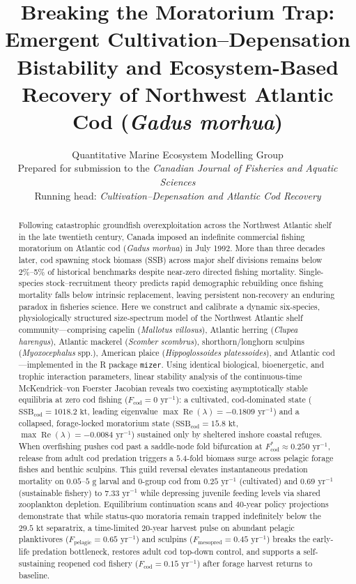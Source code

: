 \documentclass[11pt,letterpaper]{article}
\title{\textbf{Breaking the Moratorium Trap: Emergent Cultivation--Depensation Bistability and Ecosystem-Based Recovery of Northwest Atlantic Cod (\emph{Gadus morhua})}}
\author{
  Quantitative Marine Ecosystem Modelling Group\\[0.3em]
  \small Prepared for submission to the \emph{Canadian Journal of Fisheries and Aquatic Sciences}\\[0.2em]
  \small Running head: \emph{Cultivation--Depensation and Atlantic Cod Recovery}
}
\date{}
\begin{document}
\maketitle

\begin{abstract}
\noindent
Following catastrophic groundfish overexploitation across the Northwest Atlantic shelf in the late twentieth century, Canada imposed an indefinite commercial fishing moratorium on Atlantic cod (\emph{Gadus morhua}) in July 1992. More than three decades later, cod spawning stock biomass (SSB) across major shelf divisions remains below 2\%--5\% of historical benchmarks despite near-zero directed fishing mortality. Single-species stock--recruitment theory predicts rapid demographic rebuilding once fishing mortality falls below intrinsic replacement, leaving persistent non-recovery an enduring paradox in fisheries science. Here we construct and calibrate a dynamic six-species, physiologically structured size-spectrum model of the Northwest Atlantic shelf community---comprising capelin (\emph{Mallotus villosus}), Atlantic herring (\emph{Clupea harengus}), Atlantic mackerel (\emph{Scomber scombrus}), shorthorn/longhorn sculpins (\emph{Myoxocephalus} spp.), American plaice (\emph{Hippoglossoides platessoides}), and Atlantic cod---implemented in the R package \texttt{mizer}. Using identical biological, bioenergetic, and trophic interaction parameters, linear stability analysis of the continuous-time McKendrick--von Foerster Jacobian reveals two coexisting asymptotically stable equilibria at zero cod fishing ($F_{\mathrm{cod}} = 0\text{ yr}^{-1}$): a cultivated, cod-dominated state ($\mathrm{SSB}_{\mathrm{cod}} = 1018.2\text{ kt}$, leading eigenvalue $\max\operatorname{Re}(\lambda) = -0.1809\text{ yr}^{-1}$) and a collapsed, forage-locked moratorium state ($\mathrm{SSB}_{\mathrm{cod}} = 15.8\text{ kt}$, $\max\operatorname{Re}(\lambda) = -0.0084\text{ yr}^{-1}$) sustained only by sheltered inshore coastal refuges. When overfishing pushes cod past a saddle-node fold bifurcation at $F_{\mathrm{cod}}^{*} \approx 0.250\text{ yr}^{-1}$, release from adult cod predation triggers a $5.4$-fold biomass surge across pelagic forage fishes and benthic sculpins. This guild reversal elevates instantaneous predation mortality on $0.05$--$5\text{ g}$ larval and $0$-group cod from $0.25\text{ yr}^{-1}$ (cultivated) and $0.69\text{ yr}^{-1}$ (sustainable fishery) to $7.33\text{ yr}^{-1}$ while depressing juvenile feeding levels via shared zooplankton depletion. Equilibrium continuation scans and $40$-year policy projections demonstrate that while status-quo moratoria remain trapped indefinitely below the $29.5\text{ kt}$ separatrix, a time-limited $20$-year harvest pulse on abundant pelagic planktivores ($F_{\mathrm{pelagic}} = 0.65\text{ yr}^{-1}$) and sculpins ($F_{\mathrm{mesopred}} = 0.45\text{ yr}^{-1}$) breaks the early-life predation bottleneck, restores adult cod top-down control, and supports a self-sustaining reopened cod fishery ($F_{\mathrm{cod}} = 0.15\text{ yr}^{-1}$) after forage harvest returns to baseline.


\end{abstract}
\end{document}
